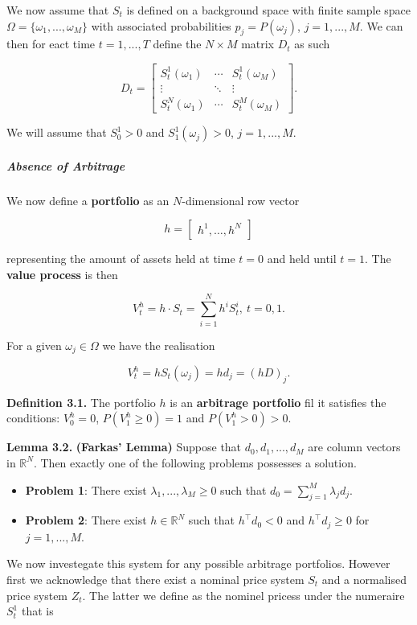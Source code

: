 \documentclass[
]{article}
\providecommand{\tightlist}{%
  \setlength{\itemsep}{0pt}\setlength{\parskip}{0pt}}
\begin{document}
We now assume that \(S_t\) is defined on a background space with finite
sample space \(\Omega = \{\omega_1,...,\omega_M\}\) with associated
probabilities \(p_j=P(\omega_j)\), \(j=1,...,M\). We can then for eact
time \(t=1,...,T\) define the \(N\times M\) matrix \(D_t\) as such

\[
D_t=\begin{bmatrix} S_t^1(\omega_1)&\cdots &S_t^1(\omega_M)\\
\vdots &\ddots & \vdots\\
S_t^N(\omega_1) &\cdots&S_t^M(\omega_M)\end{bmatrix}.
\]

We will assume that \(S_0^1>0\) and \(S_1^1(\omega_j)>0\),
\(j=1,...,M\).

\hypertarget{absence-of-arbitrage}{%
\subparagraph{Absence of Arbitrage}\label{absence-of-arbitrage}}

We now define a \textbf{portfolio} as an \(N\)-dimensional row vector

\[
h=\begin{bmatrix} h^1, \dots,h^N\end{bmatrix}
\]

representing the amount of assets held at time \(t=0\) and held until
\(t=1\). The \textbf{value process} is then

\[
V^h_t=h\cdot S_t=\sum_{i=1}^N h^iS_t^i,\ t=0,1.
\]

For a given \(\omega_j\in\Omega\) we have the realisation

\[
V_t^h=hS_t(\omega_j)=hd_j=(hD)_j.
\]

\textbf{Definition 3.1.} The portfolio \(h\) is an \textbf{arbitrage
portfolio} fil it satisfies the conditions: \(V_0^h=0\),
\(P(V_1^h\ge 0)=1\) and \(P(V_1^h>0)>0\).

\textbf{Lemma 3.2.} \textbf{(Farkas' Lemma)} Suppose that
\(d_0,d_1,...,d_M\) are column vectors in \(\mathbb{R}^N\). Then exactly
one of the following problems possesses a solution.

\begin{itemize}
\tightlist
\item
  \textbf{Problem 1}: There exist \(\lambda_1,...,\lambda_M\ge0\) such
  that \(d_0=\sum_{j=1}^M\lambda_jd_j\).
\item
  \textbf{Problem 2}: There exist \(h\in\mathbb{R}^N\) such that
  \(h^\top d_0<0\) and \(h^\top d_j\ge 0\) for \(j=1,...,M\).
\end{itemize}

We now investegate this system for any possible arbitrage portfolios.
However first we acknowledge that there exist a nominal price system
\(S_t\) and a normalised price system \(Z_t\). The latter we define as
the nominel pricess under the numeraire \(S_t^1\) that is
\end{document}
